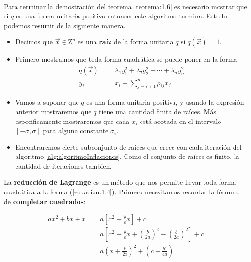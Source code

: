 \paragraph{}
Para terminar la demostración del teorema \ref{teorema:1.6} es necesario mostrar que si $q$ es una forma unitaria positiva entonces este algoritmo termina. Esto lo podemos resumir de la siguiente manera.\\
\begin{itemize}
    \item Decimos que $\overrightarrow{x} \in \mathrm{Z}^{n}$ es una \textbf{raíz} de la forma unitaria $q$ si $q(\overrightarrow{x}) = 1$.
    \item Primero mostramos que toda forma cuadrática se puede poner en la forma
    \begin{eqnarray*}
 q({\overrightarrow{x}}) &  =  & \lambda_{1}y_{1}^{2} + \lambda_{2}y_{2}^{2} + \cdots + \lambda_{n}y_{n}^{2} \\
 y_{i} &  =  & x_{i}+ \sum_{j=i+1}^{n}\rho_{ij}x_{j}
    \end{eqnarray*}
    \item Vamos a suponer que $q$ es una forma unitaria positiva, y usando la expresión anterior mostraremos que $q$ tiene una cantidad finita de raíces. Más especificamente mostraremos que cada $x_{i}$ está acotada en el intervalo $\left[-\sigma, \sigma\right]$ para alguna constante $\sigma_{i}$.
    \item Encontraremos cierto subconjunto de raíces que crece con cada iteración del algoritmo \ref{alg:algoritmoInflaciones}. Como el conjunto de raíces es finito, la cantidad de iteraciones tambien.
\end{itemize}

La \textbf{reducción de Lagrange} es un método que nos permite llevar toda forma cuadrática a la forma (\ref{ecuacion:1.4}). Primero necesitamos recordar la fórmula de \textbf{completar cuadrados}:

\begin{equation}
\begin{split}
ax^{2} + bx + x & = a\left[x^{2} + \frac{b}{a}x \right] + c\\
 & = a\left[x^{2} + \frac{b}{a}x + \left(\frac{b}{2a}\right)^{2} - \left(\frac{b}{2a}\right)^{2} \right] + c\\
 & = a\left(x + \frac{b}{2a}\right)^{2} + \left(c - \frac{b^{2}}{4a} \right)
\end{split}
\label{ecuacion:2.2}
\end{equation}

